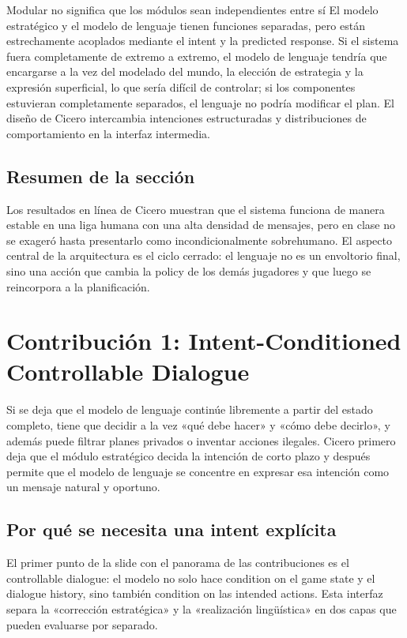 \documentclass[a4paper]{article}
\begin{document}
\begin{importantbox}{Modular no significa que los módulos sean independientes entre sí}
El modelo estratégico y el modelo de lenguaje tienen funciones separadas, pero están estrechamente acoplados mediante el intent y la predicted response. Si el sistema fuera completamente de extremo a extremo, el modelo de lenguaje tendría que encargarse a la vez del modelado del mundo, la elección de estrategia y la expresión superficial, lo que sería difícil de controlar; si los componentes estuvieran completamente separados, el lenguaje no podría modificar el plan. El diseño de Cicero intercambia intenciones estructuradas y distribuciones de comportamiento en la interfaz intermedia.
\end{importantbox}

\subsection{Resumen de la sección}

Los resultados en línea de Cicero muestran que el sistema funciona de manera estable en una liga humana con una alta densidad de mensajes, pero en clase no se exageró hasta presentarlo como incondicionalmente sobrehumano. El aspecto central de la arquitectura es el ciclo cerrado: el lenguaje no es un envoltorio final, sino una acción que cambia la policy de los demás jugadores y que luego se reincorpora a la planificación.
\section{Contribución 1: Intent-Conditioned Controllable Dialogue}

Si se deja que el modelo de lenguaje continúe libremente a partir del estado completo, tiene que decidir a la vez «qué debe hacer» y «cómo debe decirlo», y además puede filtrar planes privados o inventar acciones ilegales. Cicero primero deja que el módulo estratégico decida la intención de corto plazo y después permite que el modelo de lenguaje se concentre en expresar esa intención como un mensaje natural y oportuno.

\subsection{Por qué se necesita una intent explícita}

El primer punto de la slide con el panorama de las contribuciones es el controllable dialogue: el modelo no solo hace condition on el game state y el dialogue history, sino también condition on las intended actions. Esta interfaz separa la «corrección estratégica» y la «realización lingüística» en dos capas que pueden evaluarse por separado.
\end{document}
